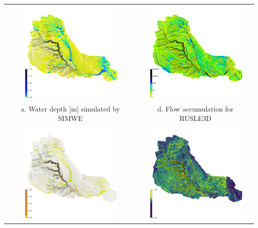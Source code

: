 \documentclass{standalone}
\begin{document}
\scriptsize
\centering 


\begin{tabular}{m{} m{}}
\multicolumn{1}{c}{\includegraphics[height=50mm]{../../images/sample_data/depth_2016.png}}&
\multicolumn{1}{c}{\includegraphics[height=50mm]{../../images/sample_data/flow_accumulation_2016.png}}\\
\multicolumn{1}{c}{a. Water depth [m] simulated by SIMWE}&
\multicolumn{1}{c}{d. Flow accumulation for RUSLE3D}\\
\multicolumn{1}{c}{\includegraphics[height=50mm]{../../images/sample_data/sediment_flux_2016.png}}&
\multicolumn{1}{c}{\includegraphics[height=50mm]{../../images/sample_data/ls_factor.png}}\\

\end{tabular}
\end{document}
